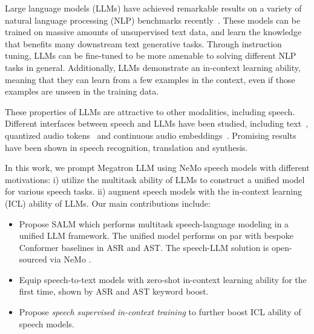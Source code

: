 \documentclass{article}
\begin{document}
Large language models (LLMs) have achieved remarkable results on a variety of natural language processing (NLP) benchmarks recently~\cite{openai2023gpt,anil2023palm}. These models can be trained on massive amounts of unsupervised text data, and learn the knowledge that benefits many downstream text generative tasks. Through instruction tuning, LLMs can be fine-tuned to be more amenable to solving different NLP tasks in general. Additionally, LLMs demonstrate an in-context learning ability, meaning that they can learn from a few examples in the context, even if those examples are unseen in the training data.



These properties of LLMs are attractive to other modalities, including speech. Different interfaces between speech and LLMs have been studied, including text~\cite{huang2023audiogpt, chen2023x,chen2023large,ma2023n}, 
quantized audio tokens~\cite{zhang2023speechgpt,rubenstein2023audiopalm} and continuous audio embeddings~\cite{gong2023listen,ling2023adapting,wu2023decoder,fathullah2023prompting,wang2023speech}. Promising results have been shown in speech recognition, translation and synthesis. 

In this work,  we prompt Megatron LLM\cite{shoeybi2019megatron} using NeMo\cite{kuchaiev2019nemo} speech models with different motivations: i)  utilize the multitask ability of LLMs to construct a unified model for various speech tasks.
ii) augment speech models with the in-context learning (ICL) ability of LLMs.
 Our main contributions include:

\begin{itemize}[leftmargin=*]
    \item  Propose SALM which performs multitask speech-language modeling in a unified LLM framework. The unified model performs on par with bespoke Conformer baselines in  ASR and AST. The speech-LLM solution is open-sourced via  NeMo \cite{kuchaiev2019nemo}.
    \item Equip speech-to-text models with zero-shot in-context learning ability for the first time, shown by   ASR and AST keyword boost. 
    \item Propose {\em speech supervised in-context training} to further boost  ICL ability of speech models.
\end{itemize}
\end{document}
